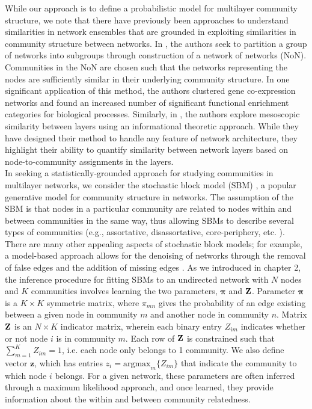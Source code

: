 \indent While our approach is to define a probabilistic model for multilayer community structure, we note that there have previously been approaches to understand similarities in network ensembles that are grounded in exploiting similarities in community structure between networks. In \cite{NONCluster}, the authors seek to partition a group of networks into subgroups through construction of a network of networks (NoN). Communities in the NoN are chosen such that the networks representing the nodes are sufficiently similar in their underlying community structure. In one significant application of this method, the authors clustered gene co-expression networks and found an increased number of significant functional enrichment categories for biological processes. Similarly, in \cite{confusingMesoscopic}, the authors explore mesoscopic similarity between layers using an informational theoretic approach. While they have designed their method to handle any feature of network architecture, they highlight their ability to quantify similarity between network layers based on node-to-community assignments in the layers. \\
%
%
\indent In seeking a statistically-grounded approach for studying communities in multilayer networks, we consider the stochastic block model (SBM) \cite{SBM}, a popular generative model for community structure in networks. The assumption of the SBM is that nodes in a particular community are related to nodes within and between communities in the same way, thus allowing SBMs to describe several types of communities (e.g., assortative, disassortative, core-periphery, etc. \cite{rombach2014core,aicher2015learning}). 
%
There are many other appealing aspects of stochastic block models; for example, a model-based approach allows for the denoising of networks through the removal of false edges and the addition of missing edges \cite{abby,guimera2009missing}.
%
As we introduced in chapter 2, the inference procedure for fitting SBMs to an undirected network with $N$ nodes and $K$ communities involves learning the two parameters, ${\boldsymbol \pi}$ and ${\bf Z}$. Parameter ${\boldsymbol \pi}$ is a $K \times K$ symmetric matrix, where $\pi_{mn}$ gives the probability of an edge existing between a given node in community $m$ and another node in community $n$. Matrix ${\bf Z}$ is an $N \times K$ indicator matrix, wherein each binary entry $Z_{im}$ indicates whether or not node $i$ is in community $m$. Each row of ${\bf Z}$ is constrained such that $\sum_{m=1}^{K} {Z}_{im}=1$, i.e. each node only belongs to 1 community. We also define vector $\boldsymbol z$, which has entries $z_{i}=\text{argmax}_m \{Z_{im}\}$ that indicate the community to which node $i$ belongs. For a given network, these parameters are often inferred through a maximum likelihood approach, and once learned, they provide information about the within and between community relatedness. 

